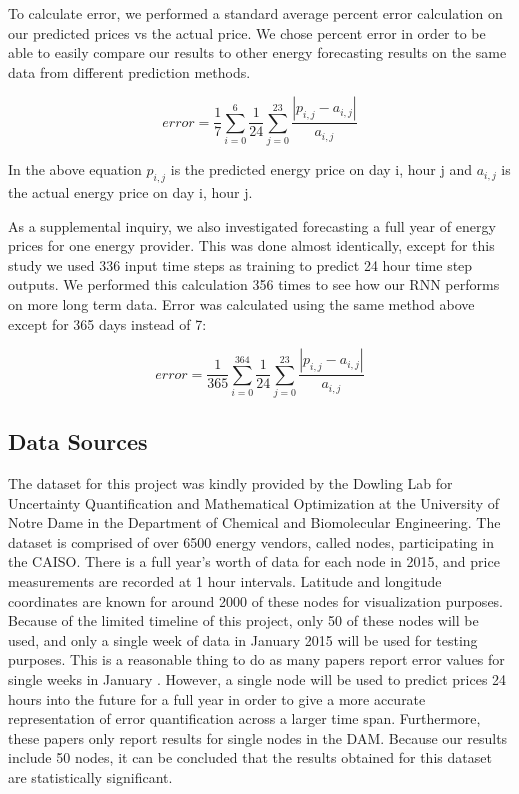 \documentclass[sigconf]{acmart}
\begin{document}
To calculate error, we performed a standard average percent error calculation on our predicted prices vs the actual price. We chose percent error in order to be able to easily compare our results to other energy forecasting results on the same data from different prediction methods.

\begin{equation}
error = \frac{1}{7}\sum_{i=0}^{6}\frac{1}{24}\sum_{j=0}^{23}\frac{|p_{i,j}-a_{i,j}|}{a_{i,j}}
\end{equation}

In the above equation $p_{i,j}$ is the predicted energy price on day i, hour j and $a_{i,j}$ is the actual energy price on day i, hour j.

As a supplemental inquiry, we also investigated forecasting a full year of energy prices for one energy provider. This was done almost identically, except for this study we used 336 input time steps as training to predict 24 hour time step outputs. We performed this calculation 356 times to see how our RNN performs on more long term data. Error was calculated using the same method above except for 365 days instead of 7:

\begin{equation}
error = \frac{1}{365}\sum_{i=0}^{364}\frac{1}{24}\sum_{j=0}^{23}\frac{|p_{i,j}-a_{i,j}|}{a_{i,j}}
\end{equation}


\subsection{Data Sources}
The dataset for this project was kindly provided by the Dowling Lab for Uncertainty Quantification and Mathematical Optimization at the University of Notre Dame in the Department of Chemical and Biomolecular Engineering. The dataset is comprised of over 6500 energy vendors, called nodes, participating in the CAISO. There is a full year's worth of data for each node in 2015, and price measurements are recorded at 1 hour intervals. Latitude and longitude coordinates are known for around 2000 of these nodes for visualization purposes. Because of the limited timeline of this project, only 50 of these nodes will be used, and only a single week of data in January 2015 will be used for testing purposes.  This is a reasonable thing to do as many papers report error values for single weeks in January \cite{Conejo2005a,Garcia2005,Tan2010}. However, a single node will be used to predict prices 24 hours into the future for a full year in order to give a more accurate representation of error quantification across a larger time span. Furthermore, these papers only report results for single nodes in the DAM. Because our results include 50 nodes, it can be concluded that the results obtained for this dataset are statistically significant. 
\end{document}

